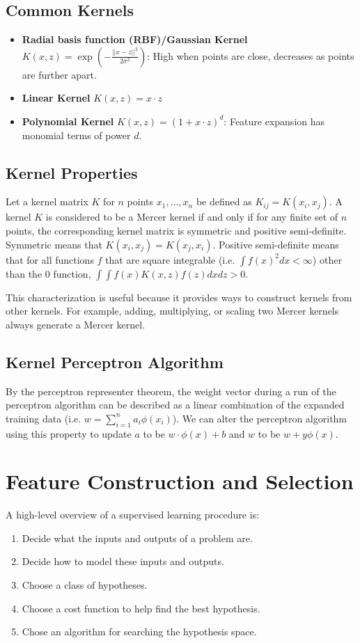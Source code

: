 \documentclass[12pt,titlepage]{article}
\let\stdsection\section
\renewcommand\section{\clearpage\stdsection}
\begin{document}
    \subsection{Common Kernels}
      \begin{itemize}
        \item \textbf{Radial basis function (RBF)/Gaussian Kernel} $K(x, z) = \exp(-\frac{||x - z||^2}{2 \sigma^2})$: High when points are close, decreases as points are further apart.
        \item \textbf{Linear Kernel} $K(x, z) = x \cdot z$
        \item \textbf{Polynomial Kernel} $K(x, z) = (1 + x \cdot z)^d$: Feature expansion has monomial terms of power $d$.
      \end{itemize}

    \subsection{Kernel Properties}
      Let a kernel matrix $K$ for $n$ points $x_1, \dots, x_n$ be defined as $K_{ij} = K(x_i, x_j)$. A kernel $K$ is considered to be a Mercer kernel if and only if
      for any finite set of $n$ points, the corresponding kernel matrix is symmetric and positive semi-definite. Symmetric means that $K(x_i, x_j) = K(x_j, x_i)$.
      Positive semi-definite means that for all functions $f$ that are square integrable (i.e. $\int f(x)^2 dx < \infty$) other than the 0 function,
      $\int \int f(x) K(x, z) f(z) dx dz > 0$.

      This characterization is useful because it provides ways to construct kernels from other kernels. For example, adding, multiplying, or scaling two Mercer kernels
      always generate a Mercer kernel.

    \subsection{Kernel Perceptron Algorithm}
      By the perceptron representer theorem, the weight vector during a run of the perceptron algorithm can be described as a linear combination of the expanded training
      data (i.e. $w = \sum_{i=1}^n a_i \phi(x_i)$). We can alter the perceptron algorithm using this property to update $a$ to be $w \cdot \phi(x) + b$ and $w$ to be
      $w + y \phi(x)$.

  \section{Feature Construction and Selection}
    A high-level overview of a supervised learning procedure is:
    \begin{enumerate}
      \item Decide what the inputs and outputs of a problem are.
      \item Decide how to model these inputs and outputs.
      \item Choose a class of hypotheses.
      \item Choose a cost function to help find the best hypothesis.
      \item Chose an algorithm for searching the hypothesis space.
    \end{enumerate}
\end{document}
